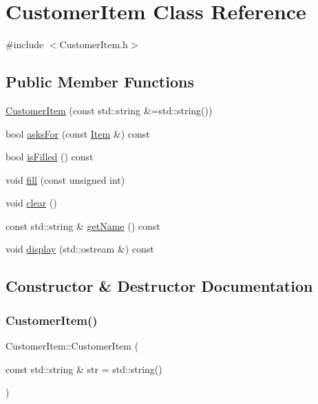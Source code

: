 \hypertarget{class_customer_item}{}\section{Customer\+Item Class Reference}
\label{class_customer_item}


{\ttfamily \#include $<$Customer\+Item.\+h$>$}

\subsection*{Public Member Functions}
\begin{DoxyCompactItemize}
\item 
\mbox{\hyperlink{class_customer_item_a7868c9be14aced9e5e6f657a0e5671fc}{Customer\+Item}} (const std\+::string \&=std\+::string())
\item 
bool \mbox{\hyperlink{class_customer_item_a6275dac4b75e3cd8e56f504140cd135d}{asks\+For}} (const \mbox{\hyperlink{class_item}{Item}} \&) const
\item 
bool \mbox{\hyperlink{class_customer_item_a39f6b78f595b7d4a20f1e7f945834335}{is\+Filled}} () const
\item 
void \mbox{\hyperlink{class_customer_item_a31c01c091f1ebc623a66d80235bc5e8c}{fill}} (const unsigned int)
\item 
void \mbox{\hyperlink{class_customer_item_af6a25490940dcac3842f877ea0da4580}{clear}} ()
\item 
const std\+::string \& \mbox{\hyperlink{class_customer_item_a7922e8405fdcfff7ca45decd2a54efdc}{get\+Name}} () const
\item 
void \mbox{\hyperlink{class_customer_item_a2aaa8551a3662bb4b2953704580fc408}{display}} (std\+::ostream \&) const
\end{DoxyCompactItemize}


\subsection{Constructor \& Destructor Documentation}
\mbox{\label{class_customer_item_a7868c9be14aced9e5e6f657a0e5671fc}} 
\subsubsection{\texorpdfstring{Customer\+Item()}{CustomerItem()}}
{\footnotesize\ttfamily Customer\+Item\+::\+Customer\+Item (\begin{DoxyParamCaption}\item[{const std\+::string \&}]{str = {\ttfamily std\+:\+:string()} }\end{DoxyParamCaption})}

